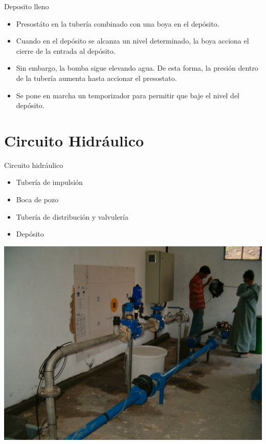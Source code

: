 \documentclass[xcolor={usenames,svgnames,dvipsnames}]{beamer}
\begin{document}
\begin{frame}[label={sec:orgd55e49c}]{Deposito lleno}
\begin{itemize}
\item \alert{Presostáto en la tubería combinado con una boya en el depósito}.

\item Cuando en el depósito se alcanza un nivel determinado, la boya acciona el cierre de la entrada al depósito.

\item Sin embargo, la bomba sigue elevando agua. De esta forma, la presión dentro de la tubería aumenta hasta accionar el presostato.

\item Se pone en marcha un temporizador para permitir que baje el nivel del depósito.
\end{itemize}
\end{frame}


\section{Circuito Hidráulico}
\label{sec:org13c7756}

\begin{frame}[label={sec:org59221eb}]{Circuito hidráulico}
\begin{itemize}
\item Tubería de impulsión

\item Boca de pozo

\item Tubería de distribución y valvulería

\item Depósito
\end{itemize}
\end{frame}

\begin{frame}[label={sec:org746ae1b}]{}
\begin{center}
\includegraphics[width=.9\linewidth]{../figs/CircuitoHidraulico.jpg}
\end{center}
\end{frame}
\end{document}
